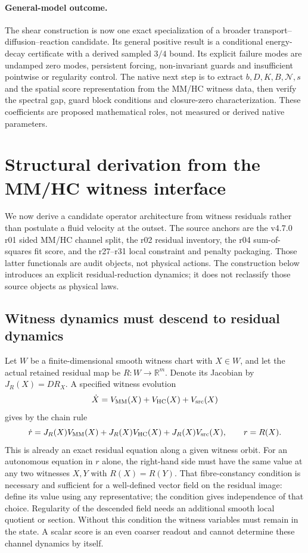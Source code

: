 \documentclass[11pt,a4paper]{article}
\begin{document}
\paragraph{General-model outcome.}
The shear construction is now one exact specialization of a broader
transport--diffusion--reaction candidate. Its general positive result is a
conditional energy-decay certificate with a derived sampled $3/4$ bound.
Its explicit failure modes are undamped zero modes, persistent forcing,
non-invariant guards and insufficient pointwise or regularity control.
The native next step is to extract $b,D,K,B,\mathcal N,s$ and the spatial
score representation from the MM/HC witness data, then verify the spectral
gap, guard block conditions and closure-zero characterization. These
coefficients are proposed mathematical roles, not measured or derived native
parameters.

\section{Structural derivation from the MM/HC witness interface}
\label{sec:structural-native-derivation}
We now derive a candidate operator architecture from witness residuals rather
than postulate a fluid velocity at the outset. The source anchors are the
v4.7.0 r01 sided MM/HC channel split, the r02 residual inventory, the r04
sum-of-squares fit score, and the r27--r31 local constraint and penalty
packaging. Those latter functionals are audit objects, not physical actions.
The construction below introduces an explicit residual-reduction dynamics;
it does not reclassify those source objects as physical laws.

\subsection{Witness dynamics must descend to residual dynamics}
Let $W$ be a finite-dimensional smooth witness chart with $X\in W$, and
let the actual retained residual map be $R:W\to\mathbb R^m$. Denote its
Jacobian by $J_R(X)=DR_X$. A specified witness evolution
\[
\dot X=V_{\rm MM}(X)+V_{\rm HC}(X)+V_{\rm src}(X)
\]
gives by the chain rule
\[
\dot r=J_R(X)V_{\rm MM}(X)+J_R(X)V_{\rm HC}(X)
+J_R(X)V_{\rm src}(X),\qquad r=R(X).
\]
This is already an exact residual equation along a given witness orbit.
For an autonomous equation in $r$ alone, the right-hand side must have
the same value at any two witnesses $X,Y$ with $R(X)=R(Y)$.
That fibre-constancy condition is necessary and sufficient for a well-defined
vector field on the residual image: define its value using any representative;
the condition gives independence of that choice. Regularity of the descended
field needs an additional smooth local quotient or section.
Without this condition the witness variables must remain in the state.
A scalar score is an even coarser readout and cannot determine these
channel dynamics by itself.
\end{document}

